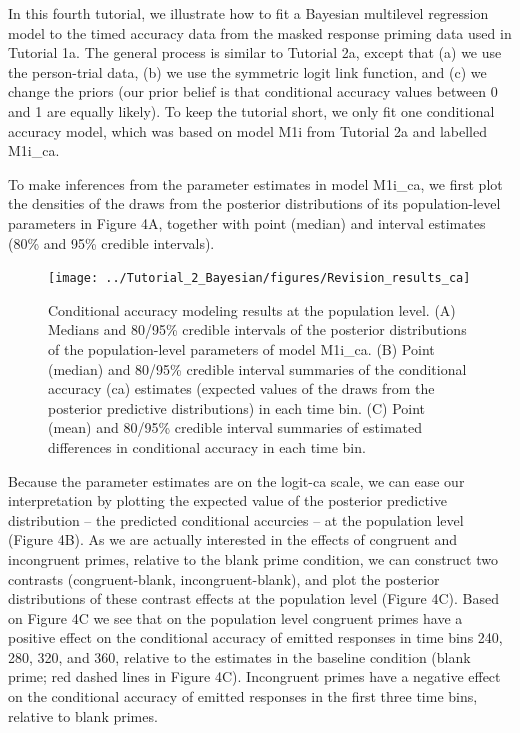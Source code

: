 \documentclass[
  man, donotrepeattitle,floatsintext]{apa6}
\begin{document}
In this fourth tutorial, we illustrate how to fit a Bayesian multilevel regression model to the timed accuracy data from the masked response priming data used in Tutorial 1a. The general process is similar to Tutorial 2a, except that (a) we use the person-trial data, (b) we use the symmetric logit link function, and (c) we change the priors (our prior belief is that conditional accuracy values between 0 and 1 are equally likely). To keep the tutorial short, we only fit one conditional accuracy model, which was based on model M1i from Tutorial 2a and labelled M1i\_ca.

To make inferences from the parameter estimates in model M1i\_ca, we first plot the densities of the draws from the posterior distributions of its population-level parameters in Figure 4A, together with point (median) and interval estimates (80\% and 95\% credible intervals).



\begin{figure}[H]

{\centering \texttt{[image: ../Tutorial\_2\_Bayesian/figures/Revision\_results\_ca]} 

}

\caption{Conditional accuracy modeling results at the population level. (A) Medians and 80/95\% credible intervals of the posterior distributions of the population-level parameters of model M1i\_ca. (B) Point (median) and 80/95\% credible interval summaries of the conditional accuracy (ca) estimates (expected values of the draws from the posterior predictive distributions) in each time bin. (C) Point (mean) and 80/95\% credible interval summaries of estimated differences in conditional accuracy in each time bin.}\label{fig:plot-ca-fixed-effects}
\end{figure}

Because the parameter estimates are on the logit-ca scale, we can ease our interpretation by plotting the expected value of the posterior predictive distribution -- the predicted conditional accurcies -- at the population level (Figure 4B). As we are actually interested in the effects of congruent and incongruent primes, relative to the blank prime condition, we can construct two contrasts (congruent-blank, incongruent-blank), and plot the posterior distributions of these contrast effects at the population level (Figure 4C). Based on Figure 4C we see that on the population level congruent primes have a positive effect on the conditional accuracy of emitted responses in time bins 240, 280, 320, and 360, relative to the estimates in the baseline condition (blank prime; red dashed lines in Figure 4C).
Incongruent primes have a negative effect on the conditional accuracy of emitted responses in the first three time bins, relative to blank primes.
\end{document}
